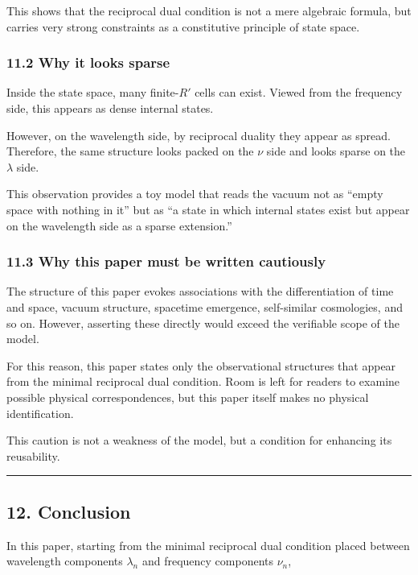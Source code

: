 \documentclass[
]{article}
\begin{document}
This shows that the reciprocal dual condition is not a mere algebraic
formula, but carries very strong constraints as a constitutive principle
of state space.

\subsubsection{11.2 Why it looks sparse}\label{why-it-looks-sparse}

Inside the state space, many finite-\(R'\) cells can exist. Viewed from
the frequency side, this appears as dense internal states.

However, on the wavelength side, by reciprocal duality they appear as
spread. Therefore, the same structure looks packed on the \(\nu\) side
and looks sparse on the \(\lambda\) side.

This observation provides a toy model that reads the vacuum not as
``empty space with nothing in it'' but as ``a state in which internal
states exist but appear on the wavelength side as a sparse extension.''

\subsubsection{11.3 Why this paper must be written
cautiously}\label{why-this-paper-must-be-written-cautiously}

The structure of this paper evokes associations with the differentiation
of time and space, vacuum structure, spacetime emergence, self-similar
cosmologies, and so on. However, asserting these directly would exceed
the verifiable scope of the model.

For this reason, this paper states only the observational structures
that appear from the minimal reciprocal dual condition. Room is left for
readers to examine possible physical correspondences, but this paper
itself makes no physical identification.

This caution is not a weakness of the model, but a condition for
enhancing its reusability.

\begin{center}\rule{0.5\linewidth}{0.5pt}\end{center}

\subsection{12. Conclusion}\label{conclusion}

In this paper, starting from the minimal reciprocal dual condition
placed between wavelength components \(\lambda_n\) and frequency
components \(\nu_n\),
\end{document}
